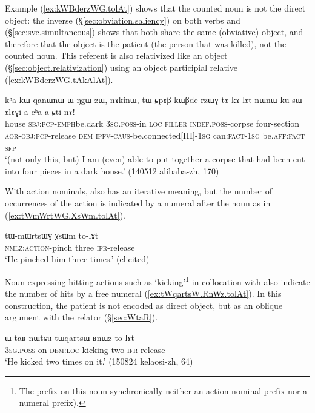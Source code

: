 Example (\ref{ex:kWBderzWG.tolAt}) shows that the counted noun is not the direct object: the inverse (§\ref{sec:obviation.saliency}) on both verbs  and  (§\ref{sec:svc.simultaneous}) shows that both share the same (obviative) object, and therefore that the object is the patient (the person that was killed), not the counted noun. This referent is also relativized like an object (§\ref{sec:object.relativization}) using an object participial relative (\ref{ex:kWBderzWG.tAkAlAt}).

\begin{exe}
\ex \label{ex:kWBderzWG.tAkAlAt}
\gll kʰa kɯ-qanɯ\redp{}nɯ ɯ-ŋgɯ zɯ, nɤkinɯ, tɯ-ɕpɤβ kɯβde-rzɯɣ tɤ-kɤ-lɤt nɯnɯ ku-sɯ-ɤlɤɣi-a cʰa-a ɕti nɤ! \\
house \textsc{sbj}:\textsc{pcp}-\textsc{emph}\redp{}be.dark \textsc{3sg}.\textsc{poss}-in \textsc{loc} \textsc{filler} \textsc{indef}.\textsc{poss}-corpse four-section \textsc{aor}-\textsc{obj}:\textsc{pcp}-release \textsc{dem} \textsc{ipfv}-\textsc{caus}-be.connected[III]-\textsc{1sg} can:\textsc{fact}-\textsc{1sg} be.\textsc{aff}:\textsc{fact} \textsc{sfp} \\
\glt `(not only this, but) I am (even) able to put together a corpse that had been cut into four pieces in a dark house.' (140512 alibaba-zh, 170)
\end{exe}

With  action nominals,  also has an iterative meaning, but the number of occurrences of the action is indicated by a numeral after the noun as in (\ref{ex:tWmWrtWG.XsWm.tolAt}).

\begin{exe}
\ex \label{ex:tWmWrtWG.XsWm.tolAt}
\gll tɯ-mɯrtsɯɣ χsɯm to-lɤt \\
\textsc{nmlz}:\textsc{action}-pinch three \textsc{ifr}-release \\
\glt `He pinched him three times.' (elicited)
\end{exe}

Noun expressing hitting actions such as  `kicking'\footnote{The  prefix on this noun synchronically neither an action nominal prefix nor a numeral prefix). } in collocation with  also indicate the number of hits by a free numeral (\ref{ex:tWqartsW.RnWz.tolAt}). In this construction, the patient is not encoded as direct object, but as an oblique argument with the relator  (§\ref{sec:WtaR}).

\begin{exe}
\ex \label{ex:tWqartsW.RnWz.tolAt}
\gll ɯ-taʁ nɯtɕu tɯqartsɯ ʁnɯz to-lɤt \\
\textsc{3sg}.\textsc{poss}-on \textsc{dem}:\textsc{loc} kicking two \textsc{ifr}-release \\
\glt `He kicked two times on it.'  (150824 kelaosi-zh, 64)
\end{exe}

